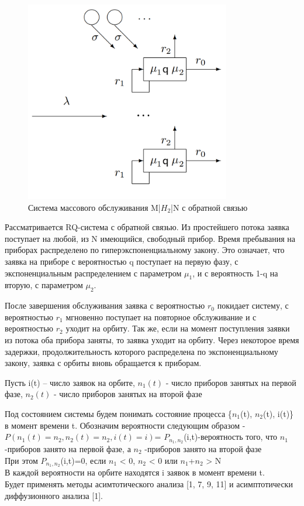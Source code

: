 \begin{figure}[htbp]
	\centering
	\includegraphics[width=0.8\textwidth]{system}
	\caption{Система массового обслуживания M|$H_{2}$|N с обратной связью}\label{fig:system}
\end{figure}


Рассматривается RQ-система с обратной связью. Из простейшего потока заявка поступает на любой, из N имеющийся, свободный прибор. Время пребывания на приборах распределено по гиперэкспоненциальному закону. Это означает, что заявка на приборе с вероятностью q поступает на первую фазу, с экспоненциальным распределением с параметром $\mu_{1}$, и с вероятность 1-q на вторую, с параметром $\mu_{2}$.

После завершения обслуживания заявка с вероятностью $r_{0}$ покидает систему, с вероятностью $r_{1}$ мгновенно поступает на повторное обслуживание и с вероятностью $r_{2}$ уходит на орбиту. Так же, если на момент поступления заявки из потока оба прибора заняты, то заявка уходит на орбиту. Через некоторое время задержки, продолжительность которого распределена по экспоненциальному закону, заявка с орбиты вновь обращается к приборам.

Пусть i(t) – число заявок на орбите, 
$n_{1}(t)$ - число приборов занятых на первой фазе,
$n_{2}(t)$ - число приборов занятых на второй фазе

Под состоянием системы будем понимать состояние процесса \{$n_{1}$(t), $n_{2}$(t), i(t)\} в момент времени t. Обозначим вероятности следующим образом -
$P(n_{1}(t) = n_{2}, n_{2}(t)=n_{2}, i(t)=i)$= $P_{n_{1},n_{2}}$(i,t)-вероятность того, что $n_{1}$ -приборов занято на первой фазе, а $n_{2}$ -приборов занято на второй фазе \\
При этом  $P_{n_{1},n_{2}}$(i,t)=0, если $n_{1}$ < 0, $n_{2}$ < 0 или $n_{1}$+$n_{2}$ > N\\
В каждой вероятности на орбите находятся i заявок в момент времени t.\\
Будет применять методы асимтотического анализа [1, 7, 9, 11] и асимптотически диффузионного анализа [1].

